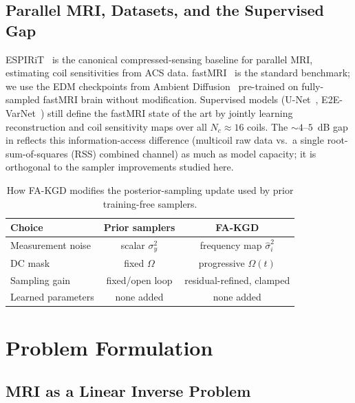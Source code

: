 \documentclass[10pt,twocolumn,letterpaper]{article}
\newcommand{\hatsig}{\hat{\sigma}}
\begin{document}
\subsection{Parallel MRI, Datasets, and the Supervised Gap}

ESPIRiT~\cite{uecker2014espirit} is the canonical compressed-sensing baseline
for parallel MRI, estimating coil sensitivities from ACS data.
fastMRI~\cite{zbontar2018fastmri} is the standard benchmark; we use the EDM
checkpoints from Ambient Diffusion~\cite{daras2025ambient} pre-trained on
fully-sampled fastMRI brain without modification. Supervised models
(U-Net~\cite{zbontar2018fastmri}, E2E-VarNet~\cite{sriram2020varnet}) still define the fastMRI state of the
art by jointly learning reconstruction and coil sensitivity maps over all
$N_c\!\approx\!16$ coils. The $\sim\!4$--$5$~dB gap in 
reflects this information-access difference (multicoil raw data vs.\ a single
root-sum-of-squares (RSS) combined channel) as much as model capacity;
it is orthogonal to the
sampler improvements studied here.

\begin{table}[t]
\centering
\caption{How FA-KGD modifies the posterior-sampling update used by prior
training-free samplers.}
\label{tab:method_compare}
\scriptsize
\setlength{\tabcolsep}{3pt}
\begin{tabular}{@{}lcc@{}}
\toprule
\textbf{Choice} & \textbf{Prior samplers} & \textbf{FA-KGD} \\
\midrule
Measurement noise & scalar $\sigma_y^2$ & frequency map $\hatsig_i^2$ \\
DC mask & fixed $\Omega$ & progressive $\Omega(t)$ \\
Sampling gain & fixed/open loop & residual-refined, clamped \\
Learned parameters & none added & none added \\
\bottomrule
\end{tabular}
\end{table}

\section{Problem Formulation}
\label{sec:problem}

\subsection{MRI as a Linear Inverse Problem}
\end{document}
